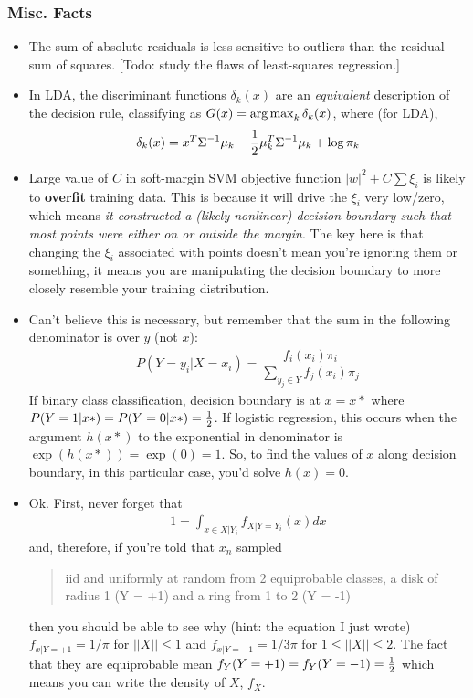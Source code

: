\documentclass[12pt]{article}
\begin{document}
\subsubsection{Misc. Facts}
\begin{itemize}
	\item The sum of absolute residuals is less sensitive to outliers than the residual sum of squares. [Todo: study the flaws of least-squares regression.]
	
	\item In LDA, the discriminant functions $\delta_k(x)$ are an \textit{equivalent} description of the decision rule, classifying as $G(x) = \operatorname*{arg\,max}_k \delta_k(x)$, where (for LDA), 
	\begin{align}
	\delta_k(x) = x^T \Sigma^{-1} \mu_k - \frac{1}{2} \mu_k^T \Sigma^{-1} \mu_k + \log\pi_k
	\end{align}
	
	\item Large value of $C$ in soft-margin SVM objective function $|w|^2 + C \sum \xi_i$ is likely to \textbf{overfit} training data. This is because it will drive the $\xi_i$ very low/zero, which means \textit{it constructed a (likely nonlinear) decision boundary such that most points were either on or outside the margin}. The key here is that changing the $\xi_i$ associated with points doesn't mean you're ignoring them or something, it means you are manipulating the decision boundary to more closely resemble your training distribution. 
	
	\item Can't believe this is necessary, but remember that the sum in the following denominator is over $y$ (not $x$):
	\begin{align}
	P(Y=y_i | X = x_i) = \dfrac{f_i(x_i) \pi_i}{\sum_{y_j \in Y} f_j(x_i) \pi_j}
	\end{align}
	If binary class classification, decision boundary is at $x=x*$ where $P(Y=1|x*) = P(Y=0|x*) = \frac{1}{2}$. If logistic regression, this occurs when the argument $h(x*)$ to the exponential in denominator is $\exp(h(x*)) = \exp(0) = 1$. So, to find the values of $x$ along decision boundary, in this particular case, you'd solve $h(x) = 0$. 
	
	
	\item \green{[DIS3.2]} Ok. First, never forget that 
	\begin{align}
	1 = \int_{x\in X|Y_i} f_{X|Y=Y_i} (x) dx
	\end{align}
	and, therefore, if you're told that $x_n$ sampled 
	\begin{small}
		\begin{quote}
			iid and uniformly at random from 2 equiprobable classes, a disk of radius 1 (Y = +1) and a ring from 1 to 2 (Y = -1)
		\end{quote}
	\end{small}
	then you should be able to see why (hint: the equation I just wrote) $f_{x|Y=+1} = 1/\pi$ for $||X|| \le 1$ and $f_{x|Y=-1} = 1/3\pi$ for $1 \le ||X|| \le 2$. The fact that they are equiprobable mean $f_{Y} (Y = +1) =  f_{Y} (Y = -1) = \frac{1}{2}$ which means you can write the density of $X$, $f_X$. 
\end{itemize}
\end{document}
